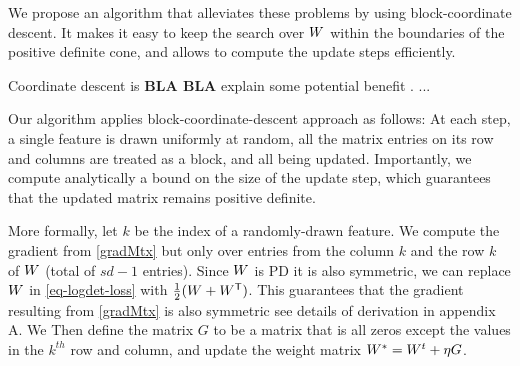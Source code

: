 \documentclass{article}
\begin{document}
We propose an algorithm that alleviates these problems by using
block-coordinate descent. It makes it easy to keep the search over
${W}$ within the boundaries of the positive definite cone, and allows
to compute the update steps efficiently.

Coordinate descent is {\bf{BLA BLA}} explain some potential benefit
\cite{}. ... 

Our algorithm applies block-coordinate-descent approach as follows: At
each step, a single feature is drawn uniformly at random, all the
matrix entries on its row and columns are treated as a block, and
all being updated. Importantly, we compute analytically a bound on the
size of the update step, which guarantees that the updated matrix
remains positive definite.

More formally, let $k$ be the index of a randomly-drawn feature. We
compute the gradient from \eqref{gradMtx} but only over entries from
the column $k$ and the row $k$ of ${W}$ (total of $sd-1$ entries).
Since ${W}$ is PD it is also symmetric, we can replace ${W}$ in
\eqref{eq-logdet-loss} with $\tfrac{1}{2}({W} + {W}{}^\mathsf{T})$.  This
guarantees that the gradient resulting from \eqref{gradMtx} is also
symmetric see details of derivation in appendix A. We Then define the
matrix $G$ to be a matrix that is all zeros except the values in the
$k^{th}$ row and column, and update the weight matrix 
${{W^*}} = {W}^t +\eta G$.
\end{document}
